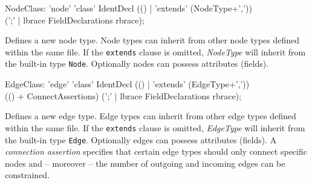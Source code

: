 \begin{rail}  
  NodeClass: 'node' 'class' IdentDecl (() | 'extends' (NodeType+',')) \\ 
    (';' | lbrace FieldDeclarations rbrace);
\end{rail}
Defines a new node type. Node types can inherit from other node types defined within the same file. If the \texttt{extends} clause is omitted, \emph{NodeType} will inherit from the built-in type \texttt{Node}. Optionally nodes can possess attributes (fields).

\begin{rail}    
  EdgeClass: 'edge' 'class' IdentDecl (() | 'extends' (EdgeType+',')) \\
    (() + ConnectAssertions) (';' | lbrace FieldDeclarations rbrace);
\end{rail}
Defines a new edge type. Edge types can inherit from other edge types defined within the same file. If the \texttt{extends} clause is omitted, \emph{EdgeType} will inherit from the built-in type \texttt{Edge}. Optionally edges can possess attributes (fields). A \emph{connection assertion} specifies that certain edge types should only connect specific nodes and -- moreover -- the number of outgoing and incoming edges can be constrained.

